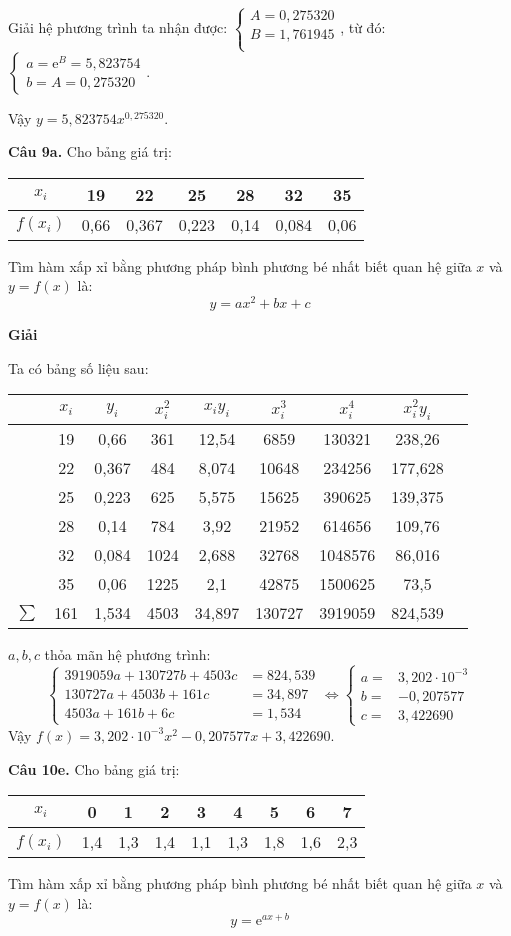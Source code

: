Giải hệ phương trình ta nhận được: $\begin{cases}
	A=0,275320\\ 
	B=1,761945\\ 
\end{cases}$, từ đó: $\begin{cases}
	a=\mathrm{e}^{B}=5,823754 \\
	b=A=0,275320
\end{cases}$.\par
Vậy $y=5,823754 x^{0,275320}$.\par

\textbf{Câu 9a.} Cho bảng giá trị:
\begin{longtable}{|c|c|c|c|c|c|c|}\hline
	$x_i$&19&22&25&28&32&35\\\hline
	$f(x_i)$&0,66&0,367&0,223&0,14&0,084&0,06\\\hline
\end{longtable}
Tìm hàm xấp xỉ bằng phương pháp bình phương bé nhất biết quan hệ giữa $x$ và $y=f(x)$ là: $$y=ax^2+bx+c$$

\textbf{Giải}\par
Ta có bảng số liệu sau:
\begin{longtable}{|Sc|c|c|c|c|c|c|c|}\hline
	&$x_i$&$y_i$&$x_i^2$&$x_iy_i$&$x_i^3$&$x_i^4$&$x_i^2y_i$\\\hline
	\endhead
	&19&0,66&361&12,54&6859&130321&238,26\\\hline
	&22&0,367&484&8,074&10648&234256&177,628\\\hline
	&25&0,223&625&5,575&15625&390625&139,375\\\hline
	&28&0,14&784&3,92&21952&614656&109,76\\\hline
	&32&0,084&1024&2,688&32768&1048576&86,016\\\hline
	&35&0,06&1225&2,1&42875&1500625&73,5\\\hline
	$\sum$&161&1,534&4503&34,897&130727&3919059&824,539\\\hline
\end{longtable}

$a,b,c$ thỏa mãn hệ phương trình:
$$\begin{cases}
	3919059a + 130727b + 4503c &=  824,539 \\ 
	130727a + 4503b + 161c &=  3 4,897 \\ 
	4503a+161b+6c&=1,534
\end{cases}
\Leftrightarrow
\begin{cases}
	a=&3,202\cdot 10^{-3}\\ 
	b=& -0,207577\\
	c=&3,422690
\end{cases}$$
Vậy $f(x)=3,{{202\cdot 10}^{-3}}{{x}^{2}}-0,207577x+3,422690.$
\par
\textbf{Câu 10e.} Cho bảng giá trị:
\begin{longtable}{|c|c|c|c|c|c|c|c|c|}\hline
	$x_i$&0&1&2&3&4&5&6&7\\ \hline
	$f(x_i)$&1,4&1,3&1,4&1,1&1,3&1,8&1,6&2,3\\ \hline
\end{longtable}
Tìm hàm xấp xỉ bằng phương pháp bình phương bé nhất biết quan hệ giữa $x$ và $y=f(x)$ là: $$y=\mathrm{e}^{ax+b}$$

